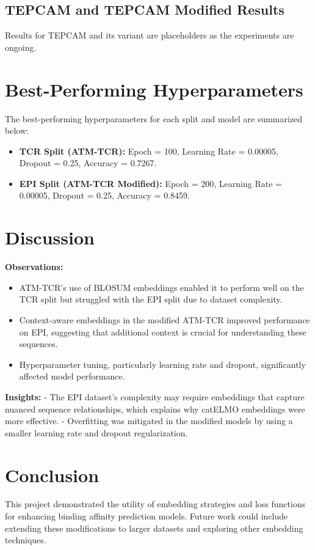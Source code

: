 \documentclass[11pt,a4paper]{article}
\begin{document}
\subsection{TEPCAM and TEPCAM Modified Results}
Results for TEPCAM and its variant are placeholders as the experiments are ongoing.

\section{Best-Performing Hyperparameters}
The best-performing hyperparameters for each split and model are summarized below:
\begin{itemize}
    \item \textbf{TCR Split (ATM-TCR):} Epoch = 100, Learning Rate = 0.00005, Dropout = 0.25, Accuracy = 0.7267.
    \item \textbf{EPI Split (ATM-TCR Modified):} Epoch = 200, Learning Rate = 0.00005, Dropout = 0.25, Accuracy = 0.8459.
\end{itemize}

\section{Discussion}
\textbf{Observations:}
\begin{itemize}
    \item ATM-TCR's use of BLOSUM embeddings enabled it to perform well on the TCR split but struggled with the EPI split due to dataset complexity.
    \item Context-aware embeddings in the modified ATM-TCR improved performance on EPI, suggesting that additional context is crucial for understanding these sequences.
    \item Hyperparameter tuning, particularly learning rate and dropout, significantly affected model performance.
\end{itemize}

\textbf{Insights:}
- The EPI dataset's complexity may require embeddings that capture nuanced sequence relationships, which explains why catELMO embeddings were more effective.
- Overfitting was mitigated in the modified models by using a smaller learning rate and dropout regularization.

\section{Conclusion}
This project demonstrated the utility of embedding strategies and loss functions for enhancing binding affinity prediction models. Future work could include extending these modifications to larger datasets and exploring other embedding techniques.
\end{document}
